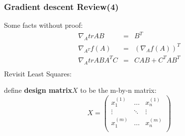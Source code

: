 \documentclass[slidestop,compress,mathserif]{beamer}
\begin{document}
    \begin{frame}
        \frametitle{Gradient descent Review(4)}
        Some facts without proof:
        \begin{eqnarray*}
            \nabla_AtrAB &=& B^T\\
            \nabla_{A^T}f(A) &=& (\nabla_Af(A))^T\\
            \nabla_AtrABA^TC &=& CAB+ C^TAB^T\\
        \end{eqnarray*}
        Revisit Least Squares:

        define \textbf{design matrix}$X$ to be the m-by-n matrix:
        $$X=\left(
              \begin{array}{ccc}
                x_1^{(1)} & \ldots & x_n^{(1)} \\
                \vdots & \ddots & \vdots \\
                x_1^{(m)} & \ldots & x_n^{(m)} \\
              \end{array}
            \right)
        $$
    \end{frame}
\end{document}
